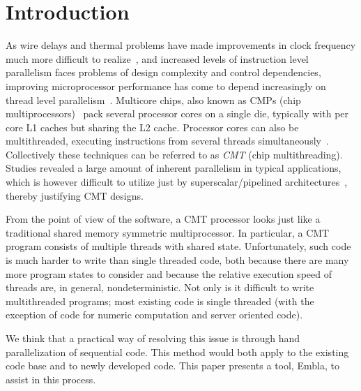 %

\section{Introduction}

As wire delays and thermal problems have made improvements in clock
frequency much more difficult to realize~\cite{KAB03}, and increased levels of
instruction level parallelism faces problems of design complexity and
control dependencies, improving microprocessor performance has come to
depend increasingly on thread level parallelism~\cite{Sutter05}. Multicore chips, also
known as CMPs (chip multiprocessors)~\cite{ONHWC96} pack several processor cores on a
single die, typically with per core L1 caches but sharing the L2
cache. Processor cores can also be multithreaded, executing
instructions from several threads simultaneously~\cite{TEL95}. Collectively 
these techniques can be referred to as {\em CMT} (chip
multithreading). Studies revealed a large amount of inherent parallelism
in typical applications, which is however difficult to utilize just by
superscalar/pipelined architectures~\cite{AS92}, thereby justifying CMT designs.

From the point of view of the software, a CMT processor looks just
like a traditional shared memory symmetric multiprocessor. In particular, a CMT
program consists of multiple threads with shared state. 
Unfortunately, such code is much
harder to write than single threaded code, both because there are many
more program states to consider and because the relative execution
speed of threads are, in general, nondeterministic.  Not only is it
difficult to write multithreaded programs; most existing code is
single threaded (with the exception of code for numeric computation
and server oriented code).

We think that a practical way of resolving this issue is through hand
parallelization of sequential code. This method would both apply to
the existing code base and to newly developed code. This paper
presents a tool, Embla, to assist in this process.


